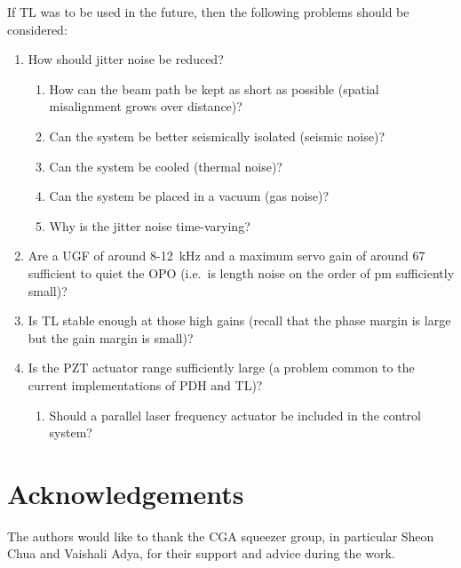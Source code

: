 \documentclass[aps,pra,superscriptaddress,reprint,nofootinbib]{revtex4-1}
\begin{document}
If TL was to be used in the future, then the following problems should be considered: 
\begin{enumerate}
\item How should jitter noise be reduced?
	\begin{enumerate}
	\item How can the beam path be kept as short as possible (spatial misalignment grows over distance)?
	\item Can the system be better seismically isolated (seismic noise)?
	\item Can the system be cooled (thermal noise)?
	\item Can the system be placed in a vacuum (gas noise)?
	\item Why is the jitter noise time-varying?
	\end{enumerate}
\item Are a UGF of around 8-12~kHz and a maximum servo gain of around 67 sufficient to quiet the OPO (i.e.\ is length noise on the order of pm sufficiently small)?
\item Is TL stable enough at those high gains (recall that the phase margin is large but the gain margin is small)?
\item Is the PZT actuator range sufficiently large (a problem common to the current implementations of PDH and TL)?
	\begin{enumerate}
	\item Should a parallel laser frequency actuator be included in the control system?
	\end{enumerate}
\end{enumerate}

\section{Acknowledgements}

The authors would like to thank the CGA squeezer group, in particular Sheon Chua and Vaishali Adya, for their support and advice during the work.


\nocite{*}


\end{document}

